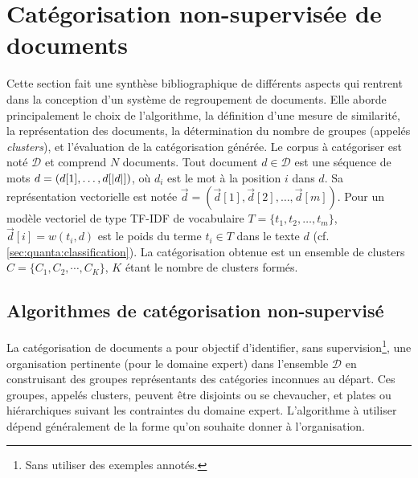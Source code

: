 \section{Catégorisation non-supervisée de documents}
\label{sec:similarite:biblio}

Cette section fait une synthèse bibliographique de différents aspects qui rentrent dans la conception d'un système de regroupement de documents. Elle aborde principalement le choix de l'algorithme, la définition d'une mesure de similarité, la représentation des documents, la détermination du nombre de groupes (appelés \textit{clusters}), et l'évaluation de la catégorisation générée. Le corpus à catégoriser est noté $\mathcal{D}$ et comprend $N$ documents. Tout document $d \in \mathcal{D}$ est une séquence de mots $d=(d[1], \dots, d[{\vert d\vert}])$, où $d_i$ est le mot à la position $i$ dans $d$. Sa représentation vectorielle  est notée $\vec{d}=(\vec{d}[1], \vec{d}[2], \dots, \vec{d}[m])$. Pour un modèle vectoriel de type TF-IDF de vocabulaire $T = \lbrace t_1, t_2, \dots, t_m \rbrace$, $\vec{d}[i] = w(t_i,d)$ est le poids du terme $t_i \in T$ dans le texte $d$ ({cf. \ref{sec:quanta:classification}}). La catégorisation obtenue est un ensemble de clusters $C = \lbrace C_1, C_2, \cdots, C_K \rbrace$, $K$ étant le nombre de clusters formés.

\subsection{Algorithmes de catégorisation non-supervisé}

La catégorisation de documents a pour objectif  d'identifier, sans supervision\footnote{Sans utiliser des exemples annotés.}, une organisation pertinente (pour le domaine expert) dans l'ensemble $\mathcal{D}$ en construisant des groupes représentants des catégories inconnues au départ. Ces groupes, appelés clusters, peuvent être disjoints ou se chevaucher, et plates ou hiérarchiques suivant les contraintes du domaine expert. L’algorithme à utiliser dépend généralement de la forme qu’on souhaite donner à l’organisation. 

